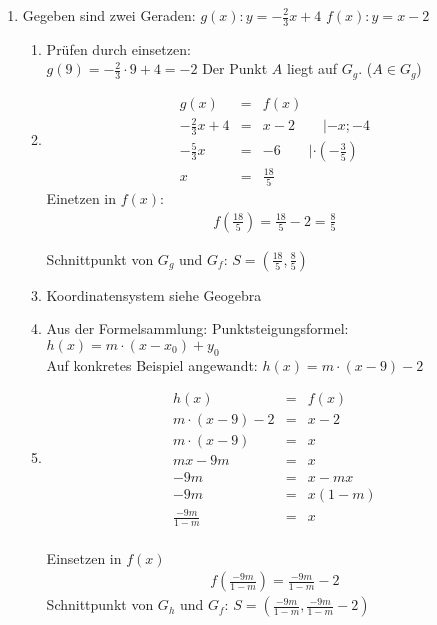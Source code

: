 \documentclass{scrartcl}
\begin{document}
		
	\begin{enumerate}
		\item Gegeben sind zwei Geraden: \quad $g(x): y = - \frac{2}{3}  x + 4$ \quad $f(x): y = x-2$
			\begin{enumerate}
				\item Prüfen durch einsetzen: \\
					$g(9)=- \frac{2}{3} \cdot 9 +4 = -2 $ \quad Der Punkt $A$ liegt auf $G_g$. ($A \in G_g$)
				\item 
					\begin{eqnarray*}
						g(x) &=& f(x)\\
						- \frac{2}{3}  x + 4 &=& x-2 \quad \quad | -x; -4\\
						- \frac{5}{3} x &=& -6 \quad\quad | \cdot (- \frac{3}{5}) \\
						x &=& \frac{18}{5}
					\end{eqnarray*}
					Einetzen in $f(x)$:
					\begin{eqnarray*}
						f \left( \frac{18}{5} \right ) = \frac{18}{5}-2 = \frac{8}{5}
					\end{eqnarray*}
					
					Schnittpunkt von $G_g$ und $G_f$: $S = \left (\frac{18}{5},\frac{8}{5} \right)$
					
					
				\item  Koordinatensystem siehe Geogebra
				

				\item Aus der Formelsammlung: Punktsteigungsformel: $h(x) = m \cdot (x - x_0 )+ y_0$ \\
					Auf konkretes Beispiel angewandt: $h(x) = m \cdot (x-9)-2$
				\item 
					\begin{eqnarray*}
						h(x)&=&f(x)\\
						m \cdot (x-9)-2 &=& x-2\\
						m \cdot (x-9) &=& x\\
						mx -9m &=& x \\
						-9m &=& x-mx \\
						-9m &=& x(1-m) \\
						\frac{-9m}{1-m} &=& x
					\end{eqnarray*} \\
					Einsetzen in $f(x)$
					\begin{eqnarray*}
						f\left(\frac{-9m}{1-m}\right) = \frac{-9m}{1-m} -2 
					\end{eqnarray*}
					Schnittpunkt von $G_h$ und $G_f$: $S = \left (\frac{-9m}{1-m},\frac{-9m}{1-m} -2  \right)$
			\end{enumerate}
			
			
	\end{enumerate} 
	
	
\end{document}
